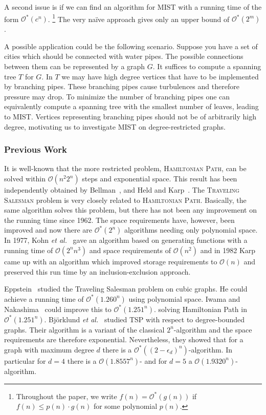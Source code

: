 \documentclass{llncs}
\newcommand{\longversion}[1]{#1}
\newcommand{\shortversion}[1]{}
\newcommand{\mc}{\mathcal}
\newcommand{\Oh}{{\mc{O}}}
\newcommand{\mist}{\textsc{MIST}\xspace}
\begin{document}
A second issue is \longversion{if we can}\shortversion{to} find an algorithm for \mist with a running time of the form $\Oh^*(c^n)$.
\footnote{\longversion{Throughout the paper, we write }$f(n) = \Oh^*(g(n))$ if $f(n) \leq p(n) \cdot g(n)$
for some polynomial $p(n)$.}  
The \longversion{very }na{\"i}ve approach gives only an upper bound of $\Oh^*(2^m)$.


A possible application could be the following scenario. \longversion{Suppose you have a set of}\shortversion{Consider} cities which should be connected with water pipes. The possible connections between them can be represented by a graph $G$. It suffices to compute a spanning tree $T$ for $G$.  In $T$ we may have high degree vertices that have to be implemented by branching pipes\longversion{. These branching pipes}\shortversion{ which} cause turbulences and therefore pressure may drop. To minimize the number of branching pipes one  can equivalently compute a spanning tree with the smallest number of leaves, leading to \mist. Vertices representing 
 branching pipes should not be of  arbitrarily high degree, motivating us to investigate \mist on degree-restricted graphs.

\subsubsection*{Previous Work}
It is well-known that the more restricted problem, \textsc{Hamiltonian Path}, can be solved within $\Oh(n^2 2^n)$ steps and exponential space. This
result has been  independently obtained by Bellman~\cite{Bel62}, and Held and Karp~\cite{HelKar62}. The \textsc{Traveling Salesman} problem is very
closely related to \textsc{Hamiltonian Path}. Basically, the same algorithm solves this problem, but there has not been any improvement on the running
time since 1962. The space requirements have, however, been improved and now there 
are $\Oh^*(2^n)$ algorithms needing only polynomial space. In 1977, Kohn \emph{et al.}~\cite{KohGotKoh77} gave an algorithm based on generating
functions with a running time of $\Oh(2^n n^3)$ and space requirements of $\Oh(n^2)$ and in 1982 Karp~\cite{Kar77} came up with an algorithm which
improved storage requirements to $\Oh(n)$ and preserved this run time by an inclusion-exclusion approach.

Eppstein~\cite{Epp03} studied the {\sc Traveling Salesman }problem on cubic graphs. He could achieve a running time of $\Oh^*(1.260^n)$ using
polynomial space. Iwama and Nakashima~\cite{IwaNak07} could improve this to $\Oh^*(1.251^n)$. solving {\sc Hamiltonian Path} in $\Oh^*(1.251^n)$.
Bj{\"o}rklund \emph{et al.}~\cite{BjoHusKasKoi08} studied TSP with respect to degree-bounded graphs. Their algorithm is a variant of the classical
$2^n$-algorithm and the space requirements are therefore exponential. Nevertheless, they showed that for a graph with maximum degree 
$d$ there is a $\Oh^*((2-\epsilon_d)^n)$-algorithm. In particular for $d=4$ there is a $\Oh(1.8557^n)$- and for $d=5$ a $\Oh(1.9320^n)$-algorithm.
\end{document}
